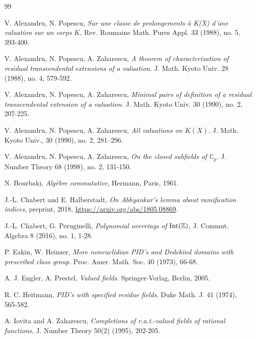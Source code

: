 \documentclass[10pt]{article}
\numberwithin{equation}{section}
\theoremstyle{definition}\newtheorem{Def}[equation]{Definition}
\theoremstyle{definition}\newtheorem{Ques}[equation]{Question}
\newcommand{\Z}{\mathbb{Z}}
\newcommand{\Int}{\textnormal{Int}}
\begin{document}
\begin{thebibliography}{99}


 V. Alexandru, N. Popescu, \emph{Sur une classe de prolongements \`a K(X) d'une valuation sur un corps $K$}, Rev. Roumaine Math. Pures Appl. 33 (1988), no. 5, 393-400. 

 V. Alexandru, N. Popescu, A. Zaharescu, \emph{A theorem of characterization of residual transcendental extensions of a valuation}. J. Math. Kyoto Univ. 28 (1988), no. 4, 579-592. 

 V. Alexandru, N. Popescu, A. Zaharescu, \emph{Minimal pairs of definition of a residual transcendental extension of a valuation}. J. Math. Kyoto Univ. 30 (1990), no. 2, 207-225.

 V. Alexandru, N. Popescu, A. Zaharescu, \emph{All valuations on $K(X)$}. J. Math. Kyoto Univ., 30 (1990), no. 2, 281–296.

 V. Alexandru, N. Popescu, A. Zaharescu, \emph{On the closed subfields of $\mathbb{C}_p$}. J. Number Theory 68 (1998), no. 2, 131-150. 


 N. Bourbaki, {\em Alg\`ebre commutative}, Hermann, Paris, 1961.

 J.-L. Chabert and E. Halberstadt, \emph{On Abhyankar's lemma about ramification indices}, preprint, 2018, \href{https://arxiv.org/abs/1805.08869}{https://arxiv.org/abs/1805.08869}.



 J.-L. Chabert, G. Peruginelli, \emph{Polynomial overrings of $\Int(\Z)$}, J. Commut. Algebra 8 (2016), no. 1, 1-28.


 P. Eakin, W. Heinzer, \emph{More noneuclidian PID's and Dedekind domains with prescribed class group}. Proc. Amer. Math. Soc. 40 (1973), 66-68.  

 A. J. Engler, A. Prestel, \emph{Valued fields}. Springer-Verlag, Berlin, 2005.


 R. C. Heitmann, \emph{PID's with specified residue fields}. Duke Math. J. 41 (1974), 565-582. 


 A. Iovita and A. Zaharescu, \emph{Completions of r.a.t.-valued fields of rational functions}, J. Number Theory 50(2) (1995), 202-205.


\end{thebibliography}
\end{document}

